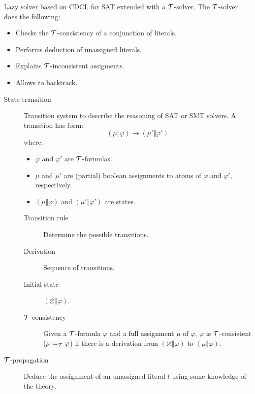 Lazy solver based on CDCL for SAT extended with a $\mathcal{T}$-solver.
The $\mathcal{T}$-solver does the following:
\begin{itemize}
    \item Checks the $\mathcal{T}$-consistency of a conjunction of literals.
    \item Performs deduction of unassigned literals.
    \item Explains $\mathcal{T}$-inconsistent assigments.
    \item Allows to backtrack.
\end{itemize}

\begin{description}
    \item[State transition] 
        Transition system to describe the reasoning of SAT or SMT solvers.
        A transition has form:
        \[ (\mu \Vert \varphi) \rightarrow (\mu' \Vert \varphi') \]
        where:
        \begin{itemize}
            \item $\varphi$ and $\varphi'$ are $\mathcal{T}$-formulas.
            \item $\mu$ and $\mu'$ are (partial) boolean assignments to atoms of $\varphi$ and $\varphi'$, respectively.
            \item $(\mu \Vert \varphi)$ and $(\mu' \Vert \varphi')$ are states.
        \end{itemize}

        \begin{description}
            \item[Transition rule] Determine the possible transitions.
            
            \item[Derivation] Sequence of transitions.
            
            \item[Initial state] $(\varnothing \Vert \varphi)$.
            
            \item[$\mathcal{T}$-consistency]
                Given a $\mathcal{T}$-formula $\varphi$ and a full assignment $\mu$ of $\varphi$,
                $\varphi$ is $\mathcal{T}$-consistent ($\mu \models_{\mathcal{T}} \varphi$)
                if there is a derivation from $(\varnothing \Vert \varphi)$ to $(\mu \Vert \varphi)$.
        \end{description}

    \item[$\mathcal{T}$-propagation] 
        Deduce the assignment of an unassigned literal $l$ using some knowledge of the theory.


\end{description}
